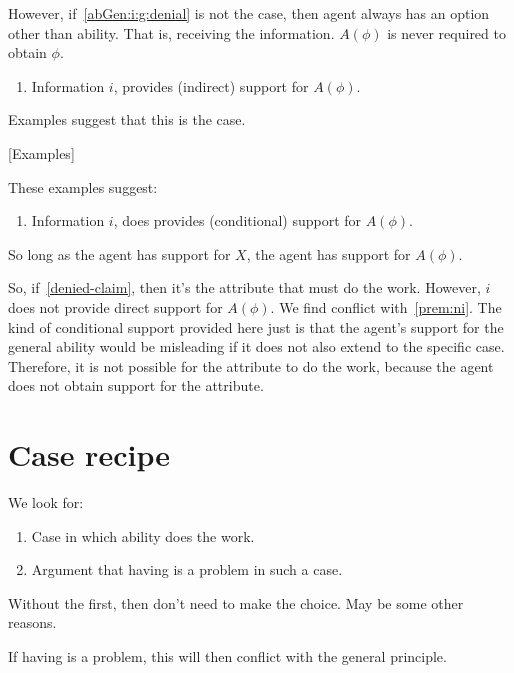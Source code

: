 However, if~\ref{abGen:i:g:denial} is not the case, then agent always has an option other than ability.
That is, receiving the information.
\(A(\phi)\) is never required to obtain \(\phi\).

\begin{enumerate}
\item\label{abGen:i:indirect} Information \(i\), provides (indirect) support for \(A(\phi)\).
\end{enumerate}

Examples suggest that this is the case.

[Examples]

These examples suggest:

\begin{enumerate}
\item\label{abGen:i:conditional} Information \(i\), does provides (conditional) support for \(A(\phi)\).
\end{enumerate}

So long as the agent has support for \(X\), the agent has support for \(A(\phi)\).


So, if~\ref{denied-claim}, then it's the attribute that must do the work.
However, \(i\) does not provide direct support for \(A(\phi)\).
We find conflict with~\ref{prem:ni}.
The kind of conditional support provided here just is that the agent's support for the general ability would be misleading if it does not also extend to the specific case.
Therefore, it is not possible for the attribute to do the work, because the agent does not obtain support for the attribute.


\newpage




\section{Case recipe}
\label{sec:case-recipe}



We look for:
\begin{enumerate}
\item Case in which ability does the work.
\item Argument that having is a problem in such a case.
\end{enumerate}

Without the first, then don't need to make the choice.
May be some other reasons.

If having is a problem, this will then conflict with the general principle.

